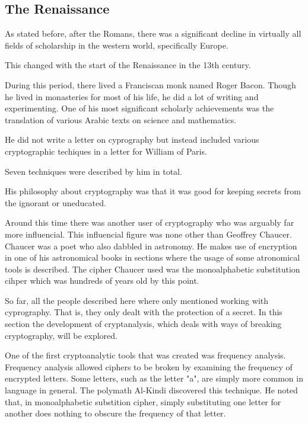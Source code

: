 \documentclass{article}
\begin{document}
    \subsection{The Renaissance}

    As stated before, after the Romans, there was a significant decline in
    virtually all fields of scholarship in the western world, specifically Europe.

    This changed with the start of the Renaissance in the 13th century.

    During this period, there lived a Franciscan monk named Roger Bacon.
    Though he lived in monasteries for most of his life, he did a lot of writing
    and experimenting.
    One of his most significant scholarly achievements was the translation
    of various Arabic texts on science and mathematics.
    
    He did not write a letter on cyprography but instead included various
    cryptographic techiques in a letter for William of Paris.

    Seven techniques were described by him in total.
   
    His philosophy about cryptography was that it was good for keeping secrets
    from the ignorant or uneducated.

    Around this time there was another user of cryptography who was arguably
    far more influencial. This influencial figure was none other than Geoffrey Chaucer.
    Chaucer was a poet who also dabbled in astronomy. He makes use of encryption
    in one of his astronomical books in sections where the usage of some atronomical tools
    is described.
    The cipher Chaucer used was the monoalphabetic substitution cihper which was hundreds
    of years old by this point.

    So far, all the people described here where only mentioned working with cyprography.
    That is, they only dealt with the protection of a secret. In this section the development
    of cryptanalysis, which deals with ways of breaking cryptography, will be explored.

    One of the first cryptoanalytic tools that was created was frequency analysis.
    Frequency analysis allowed ciphers to be broken by examining the frequency of
    encrypted letters. Some letters, such as the letter "a", are simply more common
    in language in general.
    The polymath Al-Kindi discovered this technique. He noted that, in monoalphabetic
    substition cipher, simply substituting one letter for another does nothing
    to obscure the frequency of that letter.
\end{document}
